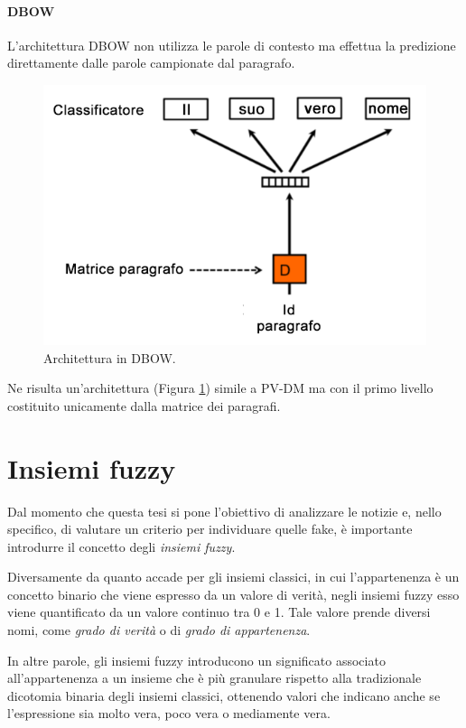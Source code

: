 \documentclass[12pt]{report}
\theoremstyle{definition}
\begin{document}
\paragraph{DBOW}
L'architettura DBOW non utilizza le parole di contesto ma effettua la predizione direttamente dalle parole campionate dal paragrafo.
\begin{figure}
    \centering
    \includegraphics[scale = 0.45]{images/dbow.png}
    \caption{Architettura in DBOW.}
    \label{dbow}
\end{figure}
Ne risulta un'architettura (Figura \ref{dbow}) simile a PV-DM ma con il primo livello costituito unicamente dalla matrice dei paragrafi.

\section{Insiemi fuzzy} \label{insiemifuzzy}
Dal momento che questa tesi si pone l'obiettivo di analizzare le notizie e, nello specifico, di valutare un criterio per individuare quelle fake, è importante introdurre il concetto degli \textit{insiemi fuzzy}.

Diversamente da quanto accade per gli insiemi classici, in cui l'appartenenza  è un concetto binario che viene espresso da un valore di verità, negli insiemi fuzzy esso viene quantificato da un valore continuo tra 0 e 1.
Tale valore prende diversi nomi, come \textit{grado di verità} o di \textit{grado di appartenenza}.

In altre parole, gli insiemi fuzzy introducono un significato associato all'appartenenza a un insieme che è più granulare rispetto alla tradizionale dicotomia binaria degli insiemi classici, ottenendo valori che indicano anche se l'espressione sia molto vera, poco vera o mediamente vera.
\end{document}
